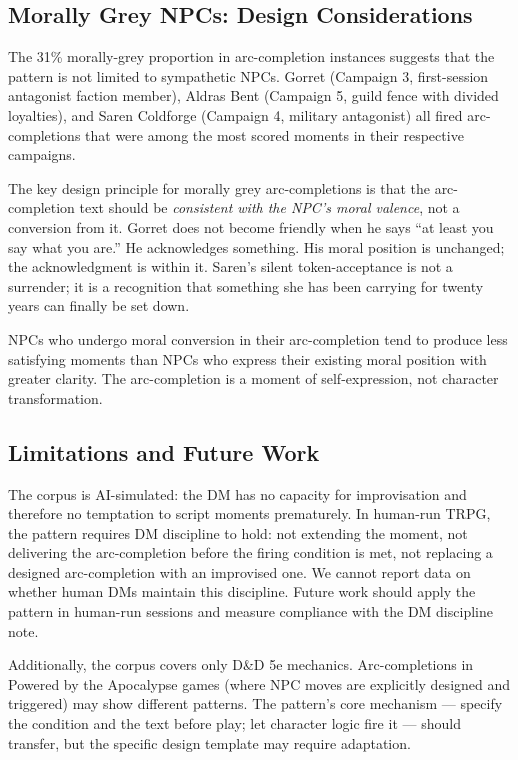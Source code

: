 \subsection{Morally Grey NPCs: Design Considerations}

The 31\% morally-grey proportion in arc-completion instances suggests that the pattern
is not limited to sympathetic NPCs. Gorret (Campaign 3, first-session antagonist
faction member), Aldras Bent (Campaign 5, guild fence with divided loyalties), and
Saren Coldforge (Campaign 4, military antagonist) all fired arc-completions that
were among the most scored moments in their respective campaigns.

The key design principle for morally grey arc-completions is that the arc-completion
text should be \textit{consistent with the NPC's moral valence}, not a conversion from it.
Gorret does not become friendly when he says ``at least you say what you are.''
He acknowledges something. His moral position is unchanged; the acknowledgment is
within it. Saren's silent token-acceptance is not a surrender; it is a recognition
that something she has been carrying for twenty years can finally be set down.

NPCs who undergo moral conversion in their arc-completion tend to produce less
satisfying moments than NPCs who express their existing moral position with greater
clarity. The arc-completion is a moment of self-expression, not character transformation.

\subsection{Limitations and Future Work}

The corpus is AI-simulated: the DM has no capacity for improvisation and therefore
no temptation to script moments prematurely. In human-run TRPG, the pattern requires
DM discipline to hold: not extending the moment, not delivering the arc-completion
before the firing condition is met, not replacing a designed arc-completion with an
improvised one. We cannot report data on whether human DMs maintain this discipline.
Future work should apply the pattern in human-run sessions and measure compliance
with the DM discipline note.

Additionally, the corpus covers only D\&D 5e mechanics. Arc-completions in Powered
by the Apocalypse games (where NPC moves are explicitly designed and triggered) may
show different patterns. The pattern's core mechanism --- specify the condition and
the text before play; let character logic fire it --- should transfer, but the
specific design template may require adaptation.
